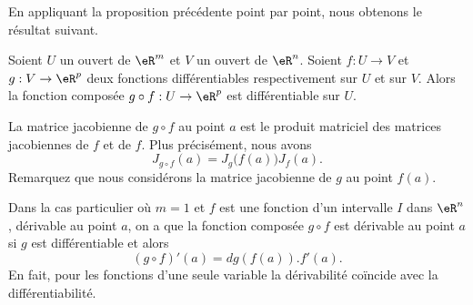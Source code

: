 En appliquant la proposition précédente point par point, nous obtenons le résultat suivant.
\begin{proposition}
Soient $U$ un ouvert de $\eR^m$ et $V$ un ouvert de $\eR^n$. Soient $f: U\to V$  et $g: V \to \eR^p$ deux fonctions différentiables respectivement sur $U $ et sur $V$. Alors la fonction composée $g\circ f: U\to \eR^p $ est différentiable sur $U$.
\end{proposition}
La matrice jacobienne de $g\circ f$ au point $a$ est le produit matriciel des matrices jacobiennes de $f$ et de $f$. Plus précisément, nous avons
\begin{equation}
	J_{g\circ f}(a)=J_g\big( f(a) \big)J_f(a).
\end{equation}
Remarquez que nous considérons la matrice jacobienne de $g$ au point $f(a)$.

Dans la cas particulier où $m=1$ et $f$ est une fonction d'un intervalle $I$ dans $\eR^n$, dérivable au point $a$, on a que la fonction composée $g\circ f$ est dérivable au point $a$ si $g$ est différentiable et alors
\[
(g\circ f)'(a)= dg\left(f(a)\right).f'(a).
\]
En fait, pour les fonctions d'une seule variable la dérivabilité coïncide avec la différentiabilité.

